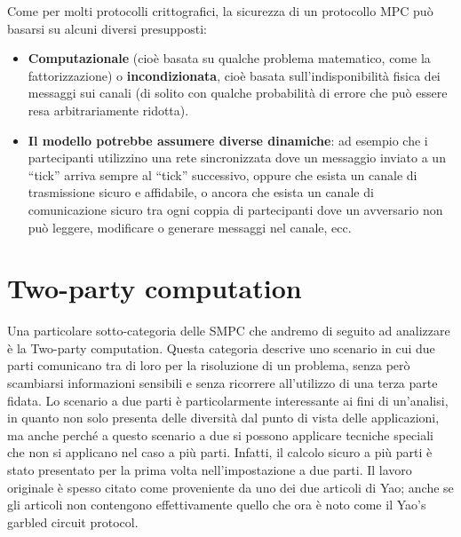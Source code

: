 \documentclass[
]{book}
\providecommand{\tightlist}{%
  \setlength{\itemsep}{0pt}\setlength{\parskip}{0pt}}
\begin{document}
Come per molti protocolli crittografici, la sicurezza di un protocollo MPC può basarsi su alcuni diversi presupposti:

\begin{itemize}
\tightlist
\item
  \textbf{Computazionale} (cioè basata su qualche problema matematico, come la fattorizzazione) o \textbf{incondizionata}, cioè basata sull'indisponibilità fisica dei messaggi sui canali (di solito con qualche probabilità di errore che può essere resa arbitrariamente ridotta).
\item
  \textbf{Il modello potrebbe assumere diverse dinamiche}: ad esempio che i partecipanti utilizzino una rete sincronizzata dove un messaggio inviato a un ``tick'' arriva sempre al ``tick'' successivo, oppure che esista un canale di trasmissione sicuro e affidabile, o ancora che esista un canale di comunicazione sicuro tra ogni coppia di partecipanti dove un avversario non può leggere, modificare o generare messaggi nel canale, ecc.
\end{itemize}

\newpage

\hypertarget{two-party-computation}{%
\section{Two-party computation}\label{two-party-computation}}

Una particolare sotto-categoria delle SMPC che andremo di seguito ad analizzare è la Two-party computation. Questa categoria descrive uno scenario in cui due parti comunicano tra di loro per la risoluzione di un problema, senza però scambiarsi informazioni sensibili e senza ricorrere all'utilizzo di una terza parte fidata.
Lo scenario a due parti è particolarmente interessante ai fini di un'analisi, in quanto non solo presenta delle diversità dal punto di vista delle applicazioni, ma anche perché a questo scenario a due si possono applicare tecniche speciali che non si applicano nel caso a più parti. Infatti, il calcolo sicuro a più parti è stato presentato per la prima volta nell'impostazione a due parti. Il lavoro originale è spesso citato come proveniente da uno dei due articoli di Yao; anche se gli articoli non contengono effettivamente quello che ora è noto come il Yao's garbled circuit protocol.
\end{document}
